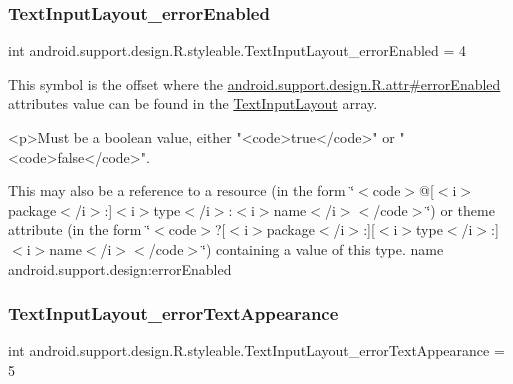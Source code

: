 \subsubsection{\texorpdfstring{Text\+Input\+Layout\+\_\+error\+Enabled}{TextInputLayout\_errorEnabled}}
{\footnotesize\ttfamily int android.\+support.\+design.\+R.\+styleable.\+Text\+Input\+Layout\+\_\+error\+Enabled = 4\hspace{0.3cm}{\ttfamily [static]}}

This symbol is the offset where the \hyperlink{classandroid_1_1support_1_1design_1_1R_1_1attr_a5430c3e8b84d5e2125c6abe6790c3ce6}{android.\+support.\+design.\+R.\+attr\#error\+Enabled} attribute\textquotesingle{}s value can be found in the \hyperlink{classandroid_1_1support_1_1design_1_1R_1_1styleable_ae01fd2fce65dc8639f3898586b0cedcf}{Text\+Input\+Layout} array.

\begin{DoxyVerb}      <p>Must be a boolean value, either "<code>true</code>" or "<code>false</code>".
\end{DoxyVerb}
 

This may also be a reference to a resource (in the form \char`\"{}$<$code$>$@\mbox{[}$<$i$>$package$<$/i$>$\+:\mbox{]}$<$i$>$type$<$/i$>$\+:$<$i$>$name$<$/i$>$$<$/code$>$\char`\"{}) or theme attribute (in the form \char`\"{}$<$code$>$?\mbox{[}$<$i$>$package$<$/i$>$\+:\mbox{]}\mbox{[}$<$i$>$type$<$/i$>$\+:\mbox{]}$<$i$>$name$<$/i$>$$<$/code$>$\char`\"{}) containing a value of this type.  name android.\+support.\+design\+:error\+Enabled \mbox{\label{classandroid_1_1support_1_1design_1_1R_1_1styleable_a6082781f4ba58bfcd9d7ce5d018a470a}} 
\subsubsection{\texorpdfstring{Text\+Input\+Layout\+\_\+error\+Text\+Appearance}{TextInputLayout\_errorTextAppearance}}
{\footnotesize\ttfamily int android.\+support.\+design.\+R.\+styleable.\+Text\+Input\+Layout\+\_\+error\+Text\+Appearance = 5\hspace{0.3cm}{\ttfamily [static]}}

